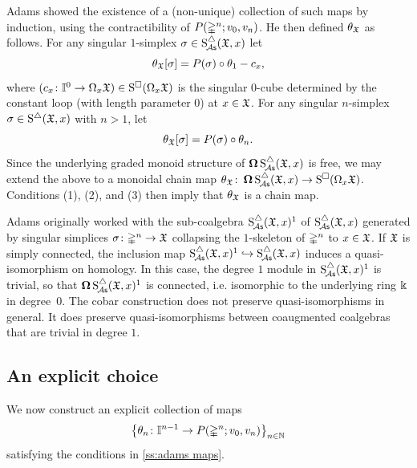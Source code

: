 Adams showed the existence of a (non-unique) collection of such maps by induction, using the contractibility of $P(\gsimplex^n;v_0,v_n)$.
He then defined $\theta_{\fX}$ as follows.
For any singular $1$-simplex $\sigma \in \sSchainsA(\fX,x)$ let
\[
\theta_{\fX}[\sigma] = P(\sigma) \circ \theta_1 - c_x,
\]
where $(c_x \colon \gcube^0 \to \loops_x \fX) \in \cSchains(\loops_x \fX)$ is the singular $0$-cube determined by the constant loop (with length parameter $0$) at $x \in \fX$.
For any singular $n$-simplex $\sigma \in \sSchains(\fX,x)$ with $n>1$, let
\[
\theta_{\fX}[\sigma] = P(\sigma) \circ \theta_n.
\]
Since the underlying graded monoid structure of $\cobar \sSchainsA(\fX,x)$ is free, we may extend the above to a monoidal chain map $\theta_{\fX} \colon \cobar \sSchainsA(\fX,x) \to \cSchains(\loops_x \fX)$.
Conditions (1), (2), and (3) then imply that $\theta_{\fX}$ is a chain map.

\begin{remark}
	Adams originally worked with the sub-coalgebra $\sSchainsA(\fX,x)^1$ of $\sSchainsA(\fX,x)$ generated by singular simplices $\sigma \colon \gsimplex^n \to \fX$ collapsing the $1$-skeleton of $\gsimplex^n$ to $x \in \fX$.
	If $\fX$ is simply connected, the inclusion map $\sSchainsA(\fX,x)^1 \hookrightarrow \sSchainsA(\fX,x)$ induces a quasi-isomorphism on homology.
	In this case, the degree $1$ module in $\sSchainsA(\fX,x)^1$ is trivial, so that $\cobar \sSchainsA(\fX,x)^1$ is connected, i.e.
	isomorphic to the underlying ring $\k$ in degree~$0$.
	The cobar construction does not preserve quasi-isomorphisms in general.
	It does preserve quasi-isomorphisms between coaugmented coalgebras that are trivial in degree $1$.
\end{remark}

\subsection{An explicit choice}\label{explicitchoice}

We now construct an explicit collection of maps
\[
\set[\big]{\theta_n \colon \gcube^{n-1} \to P(\gsimplex^n;v_0,v_n)}_{n\in\N}
\]
satisfying the conditions in \cref{ss:adams maps}.

